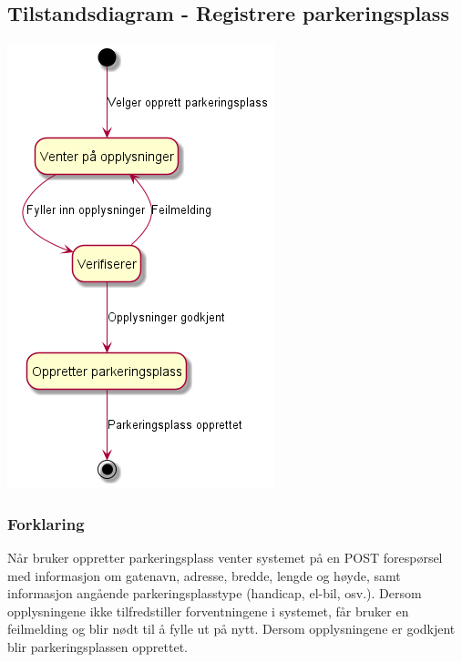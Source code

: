 \documentclass[12pt]{article}
\begin{document}
    \subsection{Tilstandsdiagram - Registrere parkeringsplass}
    \includegraphics[max width=\textwidth]{bilder/diagrammer/tilstand_opprett_parkeringsplass.png}
    
        \subsubsection{Forklaring}
        Når bruker oppretter parkeringsplass venter systemet på en POST forespørsel med informasjon om gatenavn, adresse, bredde, lengde og høyde, samt informasjon angående parkeringsplasstype (handicap, el-bil, osv.). Dersom opplysningene ikke tilfredstiller forventningene i systemet, får bruker en feilmelding og blir nødt til å fylle ut på nytt. Dersom opplysningene er godkjent blir parkeringsplassen opprettet. 
\end{document}
